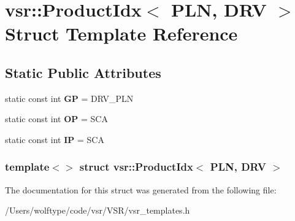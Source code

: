 \hypertarget{structvsr_1_1_product_idx_3_01_p_l_n_00_01_d_r_v_01_4}{\section{vsr\-:\-:Product\-Idx$<$ P\-L\-N, D\-R\-V $>$ Struct Template Reference}
\label{structvsr_1_1_product_idx_3_01_p_l_n_00_01_d_r_v_01_4}
}
\subsection*{Static Public Attributes}
\begin{DoxyCompactItemize}
\item 
\hypertarget{structvsr_1_1_product_idx_3_01_p_l_n_00_01_d_r_v_01_4_a97f371ff30a55e6fd8289b58a3b1bc17}{static const int {\bfseries G\-P} = D\-R\-V\-\_\-\-P\-L\-N}\label{structvsr_1_1_product_idx_3_01_p_l_n_00_01_d_r_v_01_4_a97f371ff30a55e6fd8289b58a3b1bc17}

\item 
\hypertarget{structvsr_1_1_product_idx_3_01_p_l_n_00_01_d_r_v_01_4_abbec253f03d6f788131b05a58684a96d}{static const int {\bfseries O\-P} = S\-C\-A}\label{structvsr_1_1_product_idx_3_01_p_l_n_00_01_d_r_v_01_4_abbec253f03d6f788131b05a58684a96d}

\item 
\hypertarget{structvsr_1_1_product_idx_3_01_p_l_n_00_01_d_r_v_01_4_a693a0ac6aeb317249d9dfac0a0ec1d7b}{static const int {\bfseries I\-P} = S\-C\-A}\label{structvsr_1_1_product_idx_3_01_p_l_n_00_01_d_r_v_01_4_a693a0ac6aeb317249d9dfac0a0ec1d7b}

\end{DoxyCompactItemize}
\subsubsection*{template$<$$>$ struct vsr\-::\-Product\-Idx$<$ P\-L\-N, D\-R\-V $>$}



The documentation for this struct was generated from the following file\-:\begin{DoxyCompactItemize}
\item 
/\-Users/wolftype/code/vsr/\-V\-S\-R/vsr\-\_\-templates.\-h\end{DoxyCompactItemize}
